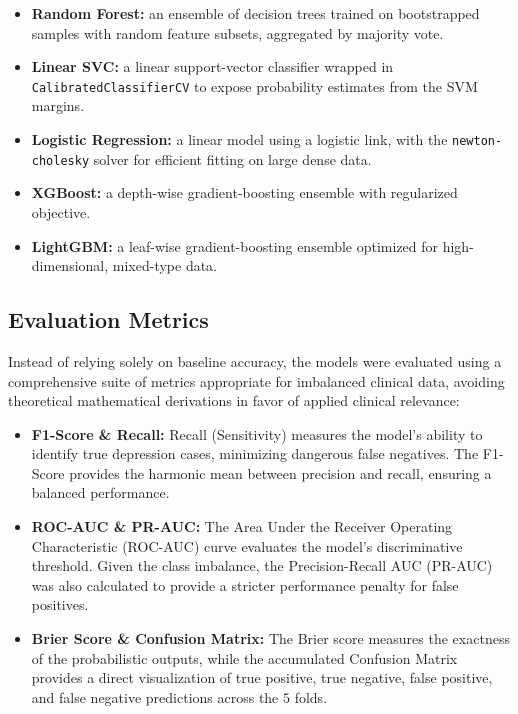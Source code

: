 \documentclass[conference]{IEEEtran}
\begin{document}
\begin{itemize}
    \item \textbf{Random Forest:} an ensemble of decision trees trained on bootstrapped samples with random feature subsets, aggregated by majority vote.
    \item \textbf{Linear SVC:} a linear support-vector classifier wrapped in \texttt{CalibratedClassifierCV} to expose probability estimates from the SVM margins.
    \item \textbf{Logistic Regression:} a linear model using a logistic link, with the \texttt{newton-cholesky} solver for efficient fitting on large dense data.
    \item \textbf{XGBoost:} a depth-wise gradient-boosting ensemble with regularized objective.
    \item \textbf{LightGBM:} a leaf-wise gradient-boosting ensemble optimized for high-dimensional, mixed-type data.
\end{itemize}

\subsection{Evaluation Metrics}
Instead of relying solely on baseline accuracy, the models were evaluated using a comprehensive suite of metrics appropriate for imbalanced clinical data, avoiding theoretical mathematical derivations in favor of applied clinical relevance:

\begin{itemize}
    \item \textbf{F1-Score \& Recall:} Recall (Sensitivity) measures the model's ability to identify true depression cases, minimizing dangerous false negatives. The F1-Score provides the harmonic mean between precision and recall, ensuring a balanced performance. %
    \item \textbf{ROC-AUC \& PR-AUC:} The Area Under the Receiver Operating Characteristic (ROC-AUC) curve evaluates the model's discriminative threshold. Given the class imbalance, the Precision-Recall AUC (PR-AUC) was also calculated to provide a stricter performance penalty for false positives. %
    \item \textbf{Brier Score \& Confusion Matrix:} The Brier score measures the exactness of the probabilistic outputs, while the accumulated Confusion Matrix provides a direct visualization of true positive, true negative, false positive, and false negative predictions across the $5$ folds. %
\end{itemize}
\end{document}
